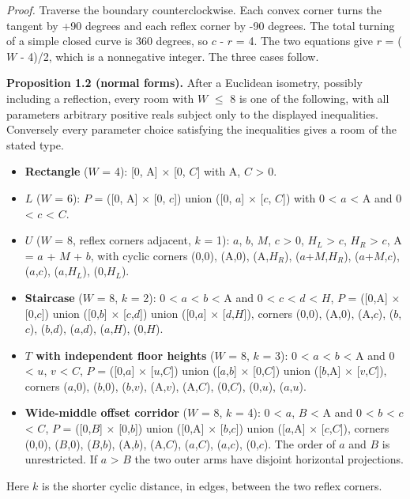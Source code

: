 \documentclass[11pt]{article}
\begin{document}
\emph{Proof.} Traverse the boundary counterclockwise. Each convex corner turns the tangent by +90 degrees and each reflex corner by -90 degrees. The total turning of a simple closed curve is 360 degrees, so \(c\) - \(r\) = 4. The two equations give \(r\) = (\(W\) - 4)/2, which is a nonnegative integer. The three cases follow.

\textbf{Proposition 1.2 (normal forms).} After a Euclidean isometry, possibly including a reflection, every room with \(W\) \(\le\) 8 is one of the following, with all parameters arbitrary positive reals subject only to the displayed inequalities. Conversely every parameter choice satisfying the inequalities gives a room of the stated type.

\begin{itemize}
\item \textbf{Rectangle} (\(W\) = 4): [0, A] \(\times\) [0, \(C\)] with A, \(C\) > 0.
\item \textbf{\(L\)} (\(W\) = 6): \(P\) = ([0, A] \(\times\) [0, \(c\)]) union ([0, \(a\)] \(\times\) [\(c\), \(C\)]) with 0 < \(a\) < A and 0 < \(c\) < \(C\).
\item \textbf{\(U\)} (\(W\) = 8, reflex corners adjacent, \(k\) = 1): \(a\), \(b\), \(M\), \(c\) > 0, \(H_{L}\) > \(c\), \(H_{R}\) > \(c\), A = \(a\) + \(M\) + \(b\), with cyclic corners (0,0), (A,0), (A,\(H_{R}\)), (\(a\)+\(M\),\(H_{R}\)), (\(a\)+\(M\),\(c\)), (\(a\),\(c\)), (\(a\),\(H_{L}\)), (0,\(H_{L}\)).
\item \textbf{Staircase} (\(W\) = 8, \(k\) = 2): 0 < \(a\) < \(b\) < A and 0 < \(c\) < \(d\) < \(H\), \(P\) = ([0,A] \(\times\) [0,\(c\)]) union ([0,\(b\)] \(\times\) [\(c\),\(d\)]) union ([0,\(a\)] \(\times\) [\(d\),\(H\)]), corners (0,0), (A,0), (A,\(c\)), (\(b\),\(c\)), (\(b\),\(d\)), (\(a\),\(d\)), (\(a\),\(H\)), (0,\(H\)).
\item \textbf{\(T\) with independent floor heights} (\(W\) = 8, \(k\) = 3): 0 < \(a\) < \(b\) < A and 0 < \(u\), \(v\) < \(C\), \(P\) = ([0,\(a\)] \(\times\) [\(u\),\(C\)]) union ([\(a\),\(b\)] \(\times\) [0,\(C\)]) union ([\(b\),A] \(\times\) [\(v\),\(C\)]), corners (\(a\),0), (\(b\),0), (\(b\),\(v\)), (A,\(v\)), (A,\(C\)), (0,\(C\)), (0,\(u\)), (\(a\),\(u\)).
\item \textbf{Wide-middle offset corridor} (\(W\) = 8, \(k\) = 4): 0 < \(a\), \(B\) < A and 0 < \(b\) < \(c\) < \(C\), \(P\) = ([0,\(B\)] \(\times\) [0,\(b\)]) union ([0,A] \(\times\) [\(b\),\(c\)]) union ([\(a\),A] \(\times\) [\(c\),\(C\)]), corners (0,0), (\(B\),0), (\(B\),\(b\)), (A,\(b\)), (A,\(C\)), (\(a\),\(C\)), (\(a\),\(c\)), (0,\(c\)). The order of \(a\) and \(B\) is unrestricted. If \(a\) > \(B\) the two outer arms have disjoint horizontal projections.
\end{itemize}
Here \(k\) is the shorter cyclic distance, in edges, between the two reflex corners.
\end{document}
